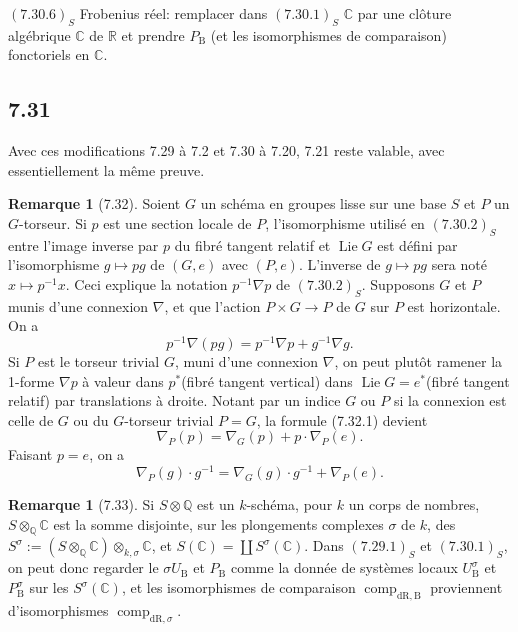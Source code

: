 \documentclass[12pt,a4paper]{article}
\theoremstyle{plain}
\theoremstyle{definition}
\newtheorem{remark}[theorem]{Remarque}
\theoremstyle{remark}
\DeclareMathOperator{\Lie}{Lie}
\DeclareMathOperator{\comp}{comp}
\newcommand{\DR}{\mathrm{dR}}
\newcommand{\B}{\mathrm{B}}
\newcommand{\Q}{\mathbb{Q}}
\newcommand{\C}{\mathbb{C}}
\newcommand{\R}{\mathbb{R}}
\begin{document}
$(7.30.6)_S$ Frobenius r\'eel: remplacer dans $(7.30.1)_S$ $\C$ par une cl\^oture alg\'ebrique $\C$ de $\R$ et prendre $P_\B$ (et les isomorphismes de comparaison) fonctoriels en $\C$.

\subsection*{7.31}
Avec ces modifications 7.29 \`a 7.2 et 7.30 \`a 7.20, 7.21 reste valable, avec essentiellement la m\^eme preuve.

\begin{remark}[7.32]\label{rem:7.32}
Soient $G$ un sch\'ema en groupes lisse sur une base $S$ et $P$ un $G$-torseur. Si $p$ est une section locale de $P$, l'isomorphisme utilis\'e en $(7.30.2)_S$ entre l'image inverse par $p$ du fibr\'e tangent relatif et $\Lie G$ est d\'efini par l'isomorphisme $g \mapsto pg$ de $(G, e)$ avec $(P, e)$. L'inverse de $g \mapsto pg$ sera not\'e $x \mapsto p^{-1}x$. Ceci explique la notation $p^{-1}\nabla p$ de $(7.30.2)_S$. Supposons $G$ et $P$ munis d'une connexion $\nabla$, et que l'action $P \times G \to P$ de $G$ sur $P$ est horizontale. On a
\begin{equation*}\tag{7.32.1}
p^{-1}\nabla(p g) = p^{-1}\nabla p + g^{-1}\nabla g.
\end{equation*}
Si $P$ est le torseur trivial $G$, muni d'une connexion $\nabla$, on peut plut\^ot ramener la 1-forme $\nabla p$ \`a valeur dans $p^*$(fibr\'e tangent vertical) dans $\Lie G = e^*$(fibr\'e tangent relatif) par translations \`a droite. Notant par un indice $G$ ou $P$ si la connexion est celle de $G$ ou du $G$-torseur trivial $P = G$, la formule (7.32.1) devient
\begin{equation*}\tag{7.32.2}
\nabla_P(p) = \nabla_G(p) + p \cdot \nabla_P(e).
\end{equation*}
Faisant $p = e$, on a
\begin{equation*}\tag{7.32.3}
\nabla_P(g) \cdot g^{-1} = \nabla_G(g) \cdot g^{-1} + \nabla_P(e).
\end{equation*}
\end{remark}

\begin{remark}[7.33]\label{rem:7.33}
Si $S \otimes \Q$ est un $k$-sch\'ema, pour $k$ un corps de nombres, $S \otimes_\Q \C$ est la somme disjointe, sur les plongements complexes $\sigma$ de $k$, des $S^\sigma := (S \otimes_\Q \C) \otimes_{k,\sigma} \C$, et $S(\C) = \coprod S^\sigma(\C)$. Dans $(7.29.1)_S$ et $(7.30.1)_S$, on peut donc regarder le $\sigma U_\B$ et $P_\B$ comme la donn\'ee de syst\`emes locaux $U^\sigma_\B$ et $P^\sigma_\B$ sur les $S^\sigma(\C)$, et les isomorphismes de comparaison $\comp_{\DR,\B}$ proviennent d'isomorphismes $\comp_{\DR,\sigma}$.
\end{remark}
\end{document}
